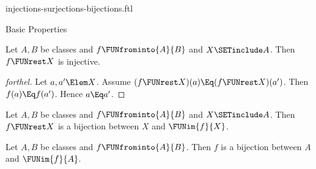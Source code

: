 \documentclass{stex}
\begin{document}
\begin{smodule}{injections-surjections-bijections.ftl}
\begin{sfragment}{Basic Properties}
  \begin{proposition}[forthel,id=FOUNDATIONS_08_2621531811217408]
    Let $A, B$ be classes and $f \FUNfrominto{A}{B}$ and $X \SETinclude A$.
    Then $f \FUNrest X$ is injective.
  \end{proposition}
  \begin{proof}[forthel]
    Let $a, a' \Elem X$.
    Assume $(f \FUNrest X)(a) \Eq (f \FUNrest X)(a')$.
    Then $f(a) \Eq f(a')$.
    Hence $a \Eq a'$.
  \end{proof}

  \begin{proposition}[forthel,id=FOUNDATIONS_08_647446231252992]
    Let $A, B$ be classes and $f \FUNfrominto{A}{B}$ and $X \SETinclude A$.
    Then $f \FUNrest X$ is a bijection between $X$ and $\FUNim{f}{X}$.
  \end{proposition}

  \begin{corollary}[forthel,id=FOUNDATIONS_08_8159443759923200]
    Let $A, B$ be classes and $f \FUNfrominto{A}{B}$.
    Then $f$ is a bijection between $A$ and $\FUNim{f}{A}$.
  \end{corollary}
\end{sfragment}
\end{smodule}
\end{document}
